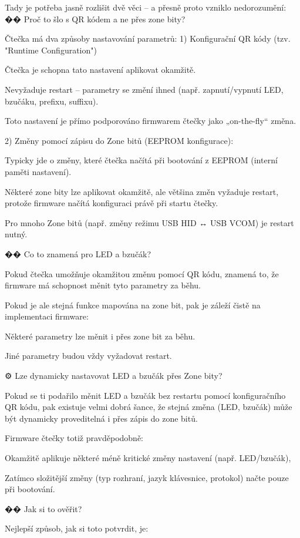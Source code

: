 Tady je potřeba jasně rozlišit dvě věci – a přesně proto vzniklo nedorozumění:
�� Proč to šlo s QR kódem a ne přes zone bity?

Čtečka má dva způsoby nastavování parametrů:
1) Konfigurační QR kódy (tzv. "Runtime Configuration")

    Čtečka je schopna tato nastavení aplikovat okamžitě.

    Nevyžaduje restart – parametry se změní ihned (např. zapnutí/vypnutí LED, bzučáku, prefixu, suffixu).

    Toto nastavení je přímo podporováno firmwarem čtečky jako „on-the-fly“ změna.

2) Změny pomocí zápisu do Zone bitů (EEPROM konfigurace):

    Typicky jde o změny, které čtečka načítá při bootování z EEPROM (interní paměti nastavení).

    Některé zone bity lze aplikovat okamžitě, ale většina změn vyžaduje restart, protože firmware načítá konfiguraci právě při startu čtečky.

    Pro mnoho Zone bitů (např. změny režimu USB HID ↔ USB VCOM) je restart nutný.

�� Co to znamená pro LED a bzučák?

    Pokud čtečka umožňuje okamžitou změnu pomocí QR kódu, znamená to, že firmware má schopnost měnit tyto parametry za běhu.

    Pokud je ale stejná funkce mapována na zone bit, pak je záleží čistě na implementaci firmware:

        Některé parametry lze měnit i přes zone bit za běhu.

        Jiné parametry budou vždy vyžadovat restart.

⚙️ Lze dynamicky nastavovat LED a bzučák přes Zone bity?

Pokud se ti podařilo měnit LED a bzučák bez restartu pomocí konfiguračního QR kódu, pak existuje velmi dobrá šance, že stejná změna (LED, bzučák) může být dynamicky proveditelná i přes zápis do zone bitů.

Firmware čtečky totiž pravděpodobně:

    Okamžitě aplikuje některé méně kritické změny nastavení (např. LED/bzučák),

    Zatímco složitější změny (typ rozhraní, jazyk klávesnice, protokol) načte pouze při bootování.

�� Jak si to ověřit?

Nejlepší způsob, jak si toto potvrdit, je:

